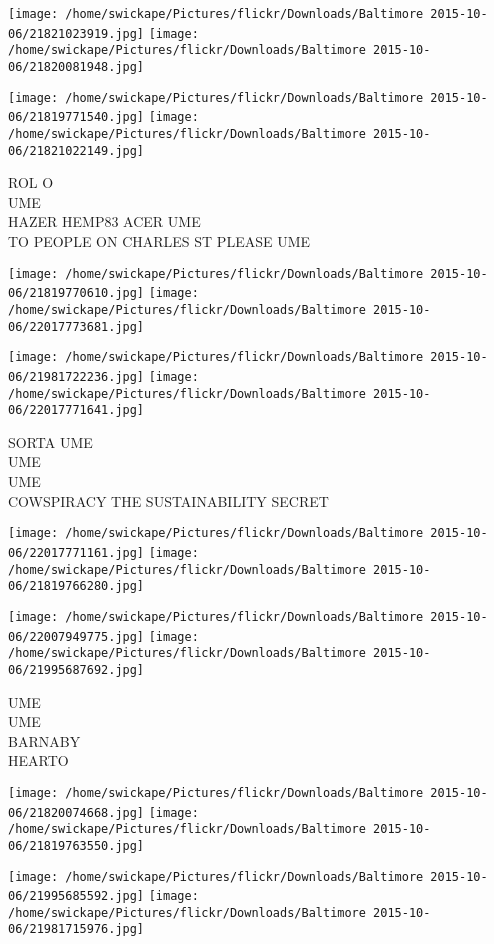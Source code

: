 \documentclass[10pt,letterpaper]{article}
\begin{document}
\texttt{[image: /home/swickape/Pictures/flickr/Downloads/Baltimore 2015-10-06/21821023919.jpg]}
\texttt{[image: /home/swickape/Pictures/flickr/Downloads/Baltimore 2015-10-06/21820081948.jpg]}

\texttt{[image: /home/swickape/Pictures/flickr/Downloads/Baltimore 2015-10-06/21819771540.jpg]}
\texttt{[image: /home/swickape/Pictures/flickr/Downloads/Baltimore 2015-10-06/21821022149.jpg]}

ROL O\\
UME\\
HAZER HEMP83 ACER UME\\
TO PEOPLE ON CHARLES ST PLEASE UME
\pagebreak

\texttt{[image: /home/swickape/Pictures/flickr/Downloads/Baltimore 2015-10-06/21819770610.jpg]}
\texttt{[image: /home/swickape/Pictures/flickr/Downloads/Baltimore 2015-10-06/22017773681.jpg]}

\texttt{[image: /home/swickape/Pictures/flickr/Downloads/Baltimore 2015-10-06/21981722236.jpg]}
\texttt{[image: /home/swickape/Pictures/flickr/Downloads/Baltimore 2015-10-06/22017771641.jpg]}

SORTA UME\\
UME\\
UME\\
COWSPIRACY THE SUSTAINABILITY SECRET
\pagebreak

\texttt{[image: /home/swickape/Pictures/flickr/Downloads/Baltimore 2015-10-06/22017771161.jpg]}
\texttt{[image: /home/swickape/Pictures/flickr/Downloads/Baltimore 2015-10-06/21819766280.jpg]}

\texttt{[image: /home/swickape/Pictures/flickr/Downloads/Baltimore 2015-10-06/22007949775.jpg]}
\texttt{[image: /home/swickape/Pictures/flickr/Downloads/Baltimore 2015-10-06/21995687692.jpg]}

UME\\
UME\\
BARNABY\\
HEARTO
\pagebreak

\texttt{[image: /home/swickape/Pictures/flickr/Downloads/Baltimore 2015-10-06/21820074668.jpg]}
\texttt{[image: /home/swickape/Pictures/flickr/Downloads/Baltimore 2015-10-06/21819763550.jpg]}

\texttt{[image: /home/swickape/Pictures/flickr/Downloads/Baltimore 2015-10-06/21995685592.jpg]}
\texttt{[image: /home/swickape/Pictures/flickr/Downloads/Baltimore 2015-10-06/21981715976.jpg]}
\end{document}
